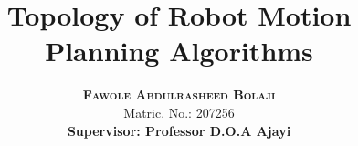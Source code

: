 
\DeclareMathOperator{\rel}{rel}
\DeclareMathOperator{\map}{map}
\DeclareMathOperator{\cat}{cat}

\renewcommand{\bibname}{References}




\title{Topology of Robot Motion Planning Algorithms}
\author{\textbf{\textsc{Fawole Abdulrasheed Bolaji}} \\ Matric. No.: 207256 \\[.35cm] \textbf{Supervisor: Professor D.O.A Ajayi} \\ }
